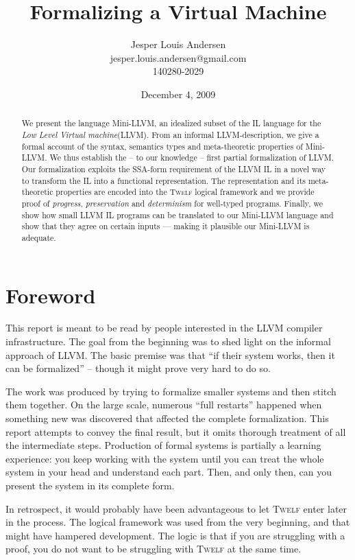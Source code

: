 \documentclass[a4paper, oneside, 10pt, draft]{memoir}
\author{Jesper Louis
  Andersen\\jesper.louis.andersen@gmail.com\\140280-2029}
\title{Formalizing a Virtual Machine}
\date{December 4, 2009}
\newcommand{\twelf}{\textsc{Twelf}}
\begin{document}
\listoffixmes{}
\maketitle{}
\begin{abstract}
  We present the language Mini-LLVM, an idealized subset of the IL
  language for the \emph{Low Level Virtual machine}(LLVM). From an
  informal LLVM-description, we give a formal account of the syntax,
  semantics types and meta-theoretic properties of Mini-LLVM. We thus
  establish the -- to our knowledge -- first partial formalization of
  LLVM. Our formalization exploits the SSA-form requirement of the
  LLVM IL in a novel way to transform the IL into a functional
  representation. The representation and its meta-theoretic properties
  are encoded into the \twelf{} logical framework and we provide proof
  of \emph{progress}, \emph{preservation} and \emph{determinism} for
  well-typed programs. Finally, we show how small
  LLVM IL programs can be translated to our Mini-LLVM language and
  show that they agree on certain inputs --- making it plausible our
  Mini-LLVM is adequate.
\end{abstract}
\newpage{}
\tableofcontents{}
\newpage{}
\section{Foreword}

This report is meant to be read by people interested in the LLVM
compiler infrastructure. The goal from the beginning was to shed
light on the informal approach of LLVM. The basic premise was that
``if their system works, then it can be formalized'' -- though it
might prove very hard to do so.

The work was produced by trying to formalize smaller systems and then
stitch them together. On the large scale, numerous ``full restarts''
happened when something new was discovered that affected the complete
formalization. This report attempts to convey the final result, but it
omits thorough treatment of all the intermediate steps. Production of
formal systems is partially a learning experience: you keep working
with the system until you can treat the whole system in your head and
understand each part. Then, and only then, can you
present the system in its complete form.

In retrospect, it would probably have been advantageous to let
\twelf{} enter later in the process. The logical framework was used
from the very beginning, and that might have hampered development. The
logic is that if you are struggling with a proof, you do not want to
be struggling with \twelf{} at the same time.
\end{document}
